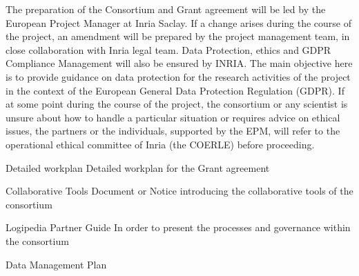 \begin{workpackage}[id=management,type=MGT,wphases=1-48,
  short=Management,
  title=Management,
  lead=Inr,InrRM=40,InnRM=2,SacRM=2,TumRM=2,LieRM=2,BelRM=2,DelRM=2,FauRM=2]
\begin{tasklist}
  \begin{task}[id=legal,title={Legal Management (data, ethics, GDPR)},shorttitle={Legal},
      lead=Inr,InrRM=4,wphases=1-48]
    The preparation of the Consortium and Grant agreement will be led
    by the European Project Manager at Inria Saclay. If a change
    arises during the course of the project, an amendment will be
    prepared by the project management team, in close collaboration
    with Inria legal team.  Data Protection, ethics and GDPR
    Compliance Management will also be ensured by INRIA. The main
    objective here is to provide guidance on data protection for the
    research activities of the project in the context of the European
    General Data Protection Regulation (GDPR). If at some point during
    the course of the project, the consortium or any scientist is
    unsure about how to handle a particular situation or requires
    advice on ethical issues, the partners or the individuals,
    supported by the EPM, will refer to the operational ethical
    committee of Inria (the COERLE) before proceeding.
  \end{task}

  
\end{tasklist}

\begin{wpdelivs}
  \begin{wpdeliv}[due=2,id=workplan,dissem=PU,nature=R,lead=Inr]{Detailed
      workplan} Detailed workplan for the Grant agreement
  \end{wpdeliv}

  \begin{wpdeliv}[due=2,id=collab-tools,dissem=PU,nature=R,lead=Inr]{Collaborative Tools}
    Document or Notice introducing the collaborative tools of the consortium
  \end{wpdeliv}

  \begin{wpdeliv}[due=3,id=guide,dissem=PU,nature=R,lead=Inr]{Logipedia Partner Guide}
    In order to present the processes and governance within the consortium
  \end{wpdeliv}

  \begin{wpdeliv}[due=4,id=data-plan,dissem=PU,nature=R,lead=Inr]{Data
      Management Plan}
  \end{wpdeliv}
\end{wpdelivs}

\end{workpackage}


